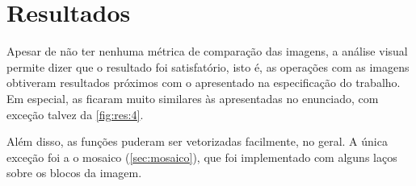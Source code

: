 \documentclass[assignment = 0]{homework}
\begin{document}
    \pagestyle{main}

    

    

    \section{Resultados}

    Apesar de não ter nenhuma métrica de comparação das imagens, a análise visual permite dizer que o resultado foi satisfatório, isto é, as operações com as imagens obtiveram resultados próximos com o apresentado na especificação do trabalho. Em especial, as  ficaram muito similares às apresentadas no enunciado, com exceção talvez da \cref{fig:res:4}.

    Além disso, as funções puderam ser vetorizadas facilmente, no geral. A única exceção foi a o mosaico (\cref{sec:mosaico}), que foi implementado com alguns laços sobre os blocos da imagem.
\end{document}

